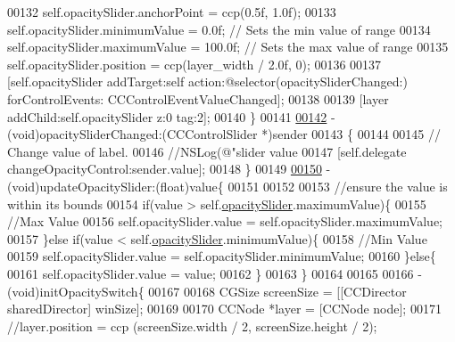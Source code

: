 \begin{DoxyCode}
{00132     \textcolor{keyword}{self}.opacitySlider.anchorPoint              = ccp(0.5f, 1.0f);
00133     \textcolor{keyword}{self}.opacitySlider.minimumValue             = 0.0f; \textcolor{comment}{// Sets the min value of range}
00134     \textcolor{keyword}{self}.opacitySlider.maximumValue             = 100.0f; \textcolor{comment}{// Sets the max value of range}
00135     \textcolor{keyword}{self}.opacitySlider.position                 = ccp(layer\_width  / 2.0f, 0);
00136     
00137     [\textcolor{keyword}{self}.opacitySlider addTarget:self action:@selector(opacitySliderChanged:) forControlEvents:
      CCControlEventValueChanged];
00138     
00139     [layer addChild:self.opacitySlider z:0 tag:2];
00140 \}
00141 
\hypertarget{_controls_layer_8mm_source_l00142}{}\hyperlink{interface_controls_layer_a83c9c1fd8899606cca2535589c0f0b45}{00142} - (void)opacitySliderChanged:(CCControlSlider *)sender
00143 \{
00144     
00145     \textcolor{comment}{// Change value of label.}
00146     \textcolor{comment}{//NSLog(@"slider value %
00147     [\textcolor{keyword}{self}.delegate changeOpacityControl:sender.value];
00148 \}
00149 
\hypertarget{_controls_layer_8mm_source_l00150}{}\hyperlink{interface_controls_layer_a5d92a7806c63fd37b54b6071dfdc611b}{00150} - (void)updateOpacitySlider:(\textcolor{keywordtype}{float})value\{
00151     
00152     
00153     \textcolor{comment}{//ensure the value is within its bounds}
00154     \textcolor{keywordflow}{if}(value > \textcolor{keyword}{self}.\hyperlink{interface_controls_layer_aff48213936f8ff3b2aa2f44d5125fc6f}{opacitySlider}.maximumValue)\{
00155         \textcolor{comment}{//Max Value}
00156         \textcolor{keyword}{self}.opacitySlider.value = \textcolor{keyword}{self}.opacitySlider.maximumValue;
00157     \}\textcolor{keywordflow}{else} \textcolor{keywordflow}{if}(value < \textcolor{keyword}{self}.\hyperlink{interface_controls_layer_aff48213936f8ff3b2aa2f44d5125fc6f}{opacitySlider}.minimumValue)\{
00158         \textcolor{comment}{//Min Value}
00159         \textcolor{keyword}{self}.opacitySlider.value = \textcolor{keyword}{self}.opacitySlider.minimumValue;
00160     \}\textcolor{keywordflow}{else}\{
00161         \textcolor{keyword}{self}.opacitySlider.value = value;
00162     \}
00163 \}
00164 
00165 
00166 - (void)initOpacitySwitch\{
00167     
00168     CGSize screenSize = [[CCDirector sharedDirector] winSize];
00169     
00170     CCNode *layer               = [CCNode node];
00171     \textcolor{comment}{//layer.position              = ccp (screenSize.width / 2, screenSize.height / 2);}
}}
\end{DoxyCode}
